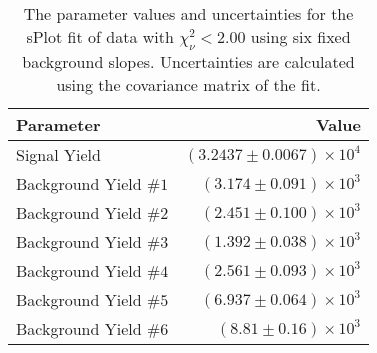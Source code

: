 
\begin{table}[ht]
    \begin{center}
        \begin{tabular}{lr}\toprule
            Parameter & Value \\\midrule
            Signal Yield & $(3.2437 \pm 0.0067) \times 10^{4}$ \\
            Background Yield $\#1$ & $(3.174 \pm 0.091) \times 10^{3}$ \\
            Background Yield $\#2$ & $(2.451 \pm 0.100) \times 10^{3}$ \\
            Background Yield $\#3$ & $(1.392 \pm 0.038) \times 10^{3}$ \\
            Background Yield $\#4$ & $(2.561 \pm 0.093) \times 10^{3}$ \\
            Background Yield $\#5$ & $(6.937 \pm 0.064) \times 10^{3}$ \\
            Background Yield $\#6$ & $(8.81 \pm 0.16) \times 10^{3}$ \\\bottomrule
        \end{tabular}
        \caption{The parameter values and uncertainties for the sPlot fit of data with $\chi^2_\nu < 2.00$ using six fixed background slopes. Uncertainties are calculated using the covariance matrix of the fit.}\label{tab:splot-fit-results-chisqdof-2.00-fixed-6}
    \end{center}
\end{table}
